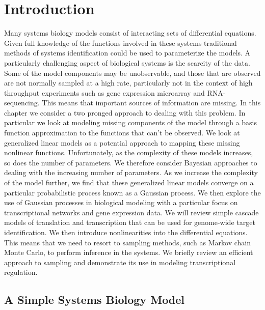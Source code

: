 \documentclass{article}
\begin{document}
\section{Introduction}

Many systems biology models consist of interacting sets of
differential equations. Given full knowledge of the functions
involved in these systems traditional methods of systems
identification could be used to parameterize the models. A
particularly challenging aspect of biological systems is the
scarcity of the data. Some of the model components may be
unobservable, and those that are observed are not normally
sampled at a high rate, particularly not in the context of high
throughput experiments such as gene expression microarray and
RNA-sequencing. This
means that important sources of information are missing. In this
chapter we consider a two pronged approach to dealing with this
problem. In particular we look at modeling missing components of
the model through a basis function approximation to the functions
that can't be observed. We look at generalized linear models as a
potential approach to mapping these missing nonlinear
functions. Unfortunately, as the complexity of these models
increases, so does the number of parameters. We therefore
consider Bayesian approaches to dealing with the increasing
number of parameters. As we increase the complexity of the model
further, we find that these generalized linear models converge on
a particular probabilistic process known as a Gaussian process. We
then explore the use of Gaussian processes in biological modeling
with a particular focus on transcriptional networks and gene
expression data. We will review simple cascade models of
translation and transcription that can be used for genome-wide
target identification. We then introduce nonlinearities into the
differential equations. This means that we need to resort to
sampling methods, such as Markov chain Monte Carlo, to perform
inference in the systems. We briefly review an efficient approach
to sampling and demonstrate its use in modeling transcriptional
regulation.

\subsection{A Simple Systems Biology Model}
\end{document}
